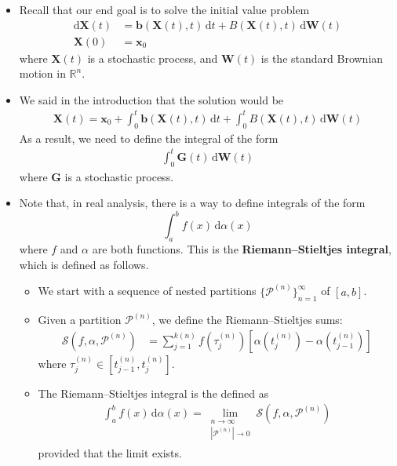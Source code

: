 \documentclass[10pt]{article}
\newcommand{\dee}{\mathrm{d}}
\newcommand{\ve}[1]{\mathbf{#1}}
\newcommand{\mcal}[1]{\mathcal{#1}}
\newcommand{\Real}{\mathbb{R}}
\begin{document}
\begin{itemize}
  \item Recall that our end goal is to solve the initial value problem
  \begin{align*}
    \dee\ve{X}(t) &= \ve{b}(\ve{X}(t), t)\, \dee t + B(\ve{X}(t), t)\, \dee\ve{W}(t) \\
    \ve{X}(0) &= \ve{x}_0
  \end{align*}
  where $\ve{X}(t)$ is a stochastic process, and $\ve{W}(t)$ is the standard Brownian motion in $\Real^n$.

  \item We said in the introduction that the solution would be
  \begin{align*}
    \ve{X}(t) = \ve{x}_0 + \int_0^t \ve{b}(\ve{X}(t), t)\, \dee t + \int_0^t B(\ve{X}(t), t)\, \dee\ve{W}(t)
  \end{align*}
  As a result, we need to define the integral of the form
  \begin{align*}
    \int_0^t \ve{G}(t)\, \dee\ve{W}(t)
  \end{align*}
  where $\ve{G}$ is a stochastic process.

  \item Note that, in real analysis, there is a way to define integrals of the form $$\int_a^b f(x)\, \dee \alpha(x)$$ where $f$ and $\alpha$ are both functions. This is the {\bf Riemann--Stieltjes integral}, which is defined as follows.
  
  \begin{itemize}
    \item We start with a sequence of nested partitions $\{ \mcal{P}^{(n)} \}_{n=1}^\infty$ of $[a,b]$.
    
    \item Given a partition $\mcal{P}^{(n)}$, we define the Riemann--Stieltjes sums: 
    \begin{align*}
      \mcal{S}(f, \alpha, \mcal{P}^{(n)}) &= \sum_{j=1}^{k(n)} f(\tau_j^{(n)}) [\alpha(t_j^{(n)}) - \alpha(t_{j-1}^{(n)})]
    \end{align*}
    where $\tau_j^{(n)} \in [t_{j-1}^{(n)}, t_{j}^{(n)}]$.
    
    \item The Riemann--Stieltjes integral is the defined as
    \begin{align*}
      \int_a^b f(x)\, \dee\alpha(x) = \lim_{\substack{ n \rightarrow \infty \\ |\mcal{P}^{(n)}| \rightarrow 0 }} \mcal{S}(f, \alpha, \mcal{P}^{(n)})
    \end{align*}
    provided that the limit exists.
  \end{itemize}


\end{itemize}
\end{document}
